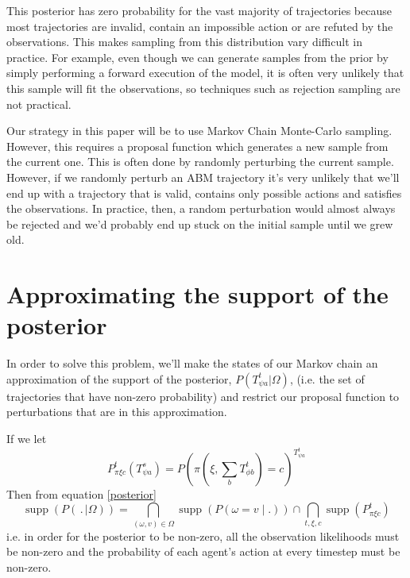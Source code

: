 \documentclass{article}
\DeclareMathOperator\supp{supp}
\begin{document}
This posterior has zero probability for the vast majority of trajectories because most trajectories are invalid, contain an impossible action or are refuted by the observations. This makes sampling from this distribution vary difficult in practice. For example, even though we can generate samples from the prior by simply performing a forward execution of the model, it is often very unlikely that this sample will fit the observations, so techniques such as rejection sampling are not practical.

Our strategy in this paper will be to use Markov Chain Monte-Carlo sampling. However, this requires a proposal function which generates a new sample from the current one. This is often done by randomly perturbing the current sample. However, if we randomly perturb an ABM trajectory it's very unlikely that we'll end up with a trajectory that is valid, contains only possible actions and satisfies the observations. In practice, then, a random perturbation would almost always be rejected and we'd probably end up stuck on the initial sample until we grew old.

\section{Approximating the support of the posterior}


In order to solve this problem, we'll make the states of our Markov chain an approximation of the support of the posterior, $P(T^t_{\psi a}|\Omega)$, (i.e. the set of trajectories that have non-zero probability) and restrict our proposal function to perturbations that are in this approximation.

If we let
\[
P^t_{\pi \xi c}(T^s_{\psi a}) = P(\pi(\xi,\sum_bT^{t}_{\phi b})=c)^{T^{t}_{\psi a}}
\]
Then from equation \ref{posterior}
\begin{equation}
\supp (P( \,.\, |\Omega)) = \bigcap_{(\omega,v) \in \Omega}  \supp(P(\omega = v \mid . )) \cap \bigcap_{t, \xi, c} \supp(P^t_{\pi \xi c})
\label{support}
\end{equation}
i.e. in order for the posterior to be non-zero, all the observation likelihoods must be non-zero and the probability of each agent's action at every timestep must be non-zero.
\end{document}

